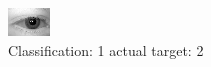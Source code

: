 \begin{figure}[h!]
\begin{center}
\includegraphics[width=0.60\columnwidth]{figures/ID448_class_1_target_2.png}
\end{center}
\caption{ Classification: 1 actual target: 2}
\label{fig:ID448_class_1_target_2}
\end{figure}
